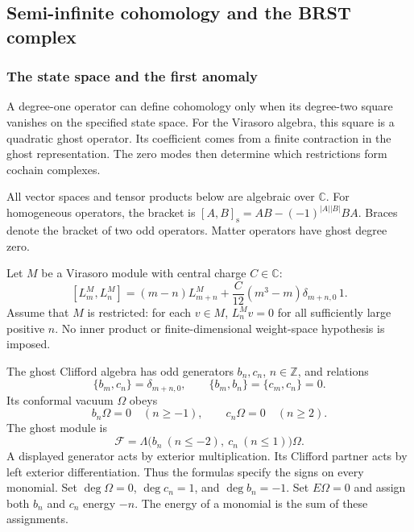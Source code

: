 \subsection{Semi-infinite cohomology and the BRST complex}

\subsubsection{The state space and the first anomaly}

A degree-one operator can define cohomology only when its degree-two square vanishes on the specified state space.
For the Virasoro algebra, this square is a quadratic ghost operator.
Its coefficient comes from a finite contraction in the ghost representation.
The zero modes then determine which restrictions form cochain complexes.

All vector spaces and tensor products below are algebraic over $\mathbb C$.
For homogeneous operators, the bracket is
$[A,B]_{\mathrm s}=AB-(-1)^{|A||B|}BA$.
Braces denote the bracket of two odd operators.
Matter operators have ghost degree zero.

Let $M$ be a Virasoro module with central charge $C\in\mathbb C$:
\begin{equation}\label{eq:vir-matter-relation}
 [L_m^M,L_n^M]=(m-n)L_{m+n}^M+
 \frac{C}{12}(m^3-m)\delta_{m+n,0}\,1.
\end{equation}
Assume that $M$ is restricted: for each $v\in M$, $L_n^Mv=0$ for all sufficiently large positive $n$.
No inner product or finite-dimensional weight-space hypothesis is imposed.

The ghost Clifford algebra has odd generators $b_n,c_n$, $n\in\mathbb Z$, and relations
\[
 \{b_m,c_n\}=\delta_{m+n,0},\qquad
 \{b_m,b_n\}=\{c_m,c_n\}=0.
\]
Its conformal vacuum $\Omega$ obeys
\begin{equation}\label{eq:vir-ghost-vacuum}
 b_n\Omega=0\quad(n\geq-1),\qquad
 c_n\Omega=0\quad(n\geq2).
\end{equation}
The ghost module is
\[
 \mathcal F=\Lambda\bigl(b_n\ (n\leq-2),\ c_n\ (n\leq1)\bigr)\Omega.
\]
A displayed generator acts by exterior multiplication.
Its Clifford partner acts by left exterior differentiation.
Thus the formulas specify the signs on every monomial.
Set $\deg\Omega=0$, $\deg c_n=1$, and $\deg b_n=-1$.
Set $E\Omega=0$ and assign both $b_n$ and $c_n$ energy $-n$.
The energy of a monomial is the sum of these assignments.


